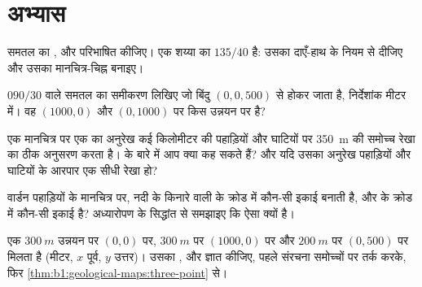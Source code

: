 \section{अभ्यास}

\begin{exercise}[$\star$]\label{exo:b1:geological-maps:1}
समतल का ,  और  परिभाषित कीजिए। एक शय्या का  $135/40$ है: उसका  दाएँ-हाथ
के नियम से दीजिए और उसका मानचित्र-चिह्न बनाइए।
\end{exercise}

\begin{exercise}[$\star$]\label{exo:b1:geological-maps:2}
 $090/30$ वाले समतल का समीकरण लिखिए जो बिंदु $(0, 0, 500)$ से होकर जाता है, निर्देशांक मीटर में। वह $(1000, 0)$ और
$(0, 1000)$ पर किस उन्नयन पर है?
\end{exercise}

\begin{exercise}[$\star$]\label{exo:b1:geological-maps:3}
एक मानचित्र पर एक  का अनुरेख कई किलोमीटर की पहाड़ियों और घाटियों पर \qty{350}{m} की समोच्च रेखा का
ठीक अनुसरण करता है।  के बारे में आप क्या कह सकते हैं? और यदि उसका अनुरेख पहाड़ियों और घाटियों के आरपार एक
सीधी रेखा हो?
\end{exercise}

\begin{exercise}[$\star$]\label{exo:b1:geological-maps:4}
वार्डन पहाड़ियों के मानचित्र पर, नदी के किनारे वाली  के क्रोड में कौन-सी इकाई  बनाती है, और 
के क्रोड में कौन-सी इकाई है? अध्यारोपण के सिद्धांत से समझाइए कि ऐसा क्यों है।
\end{exercise}

\begin{exercise}[$\star\star$]\label{exo:b1:geological-maps:5}
एक  $\qty{300}{m}$ उन्नयन पर $(0, 0)$ पर, $\qty{300}{m}$ पर $(1000, 0)$ पर और $\qty{200}{m}$ पर $(0, 500)$ पर मिलता है
(मीटर, $x$ पूर्व, $y$ उत्तर)। उसका ,  और  ज्ञात कीजिए, पहले संरचना समोच्चों पर
तर्क करके, फिर \cref{thm:b1:geological-maps:three-point} से।
\end{exercise}

